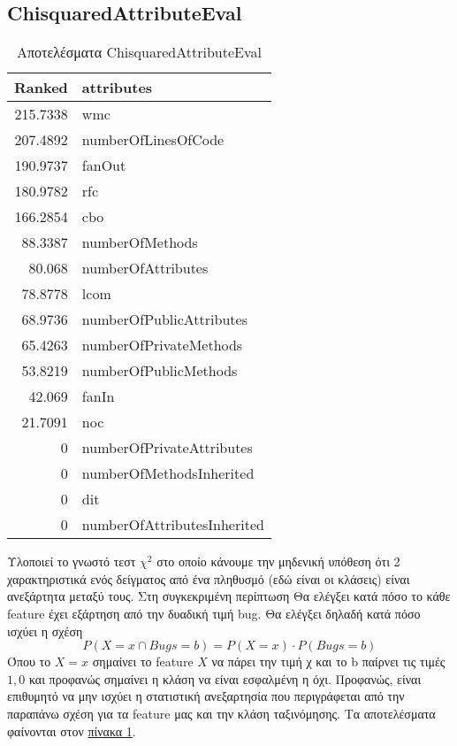 \subsection{ChisquaredAttributeEval}
\begin{table}[tbh]
\centering
\begin{tabular}{r|l}
Ranked& attributes\\
\hline
215.7338 &  wmc\\
207.4892 &   numberOfLinesOfCode\\
190.9737 &   fanOut\\
180.9782 &  rfc\\
166.2854 &   cbo\\
88.3387 &  numberOfMethods\\
80.068  &   numberOfAttributes\\
78.8778&   lcom\\
68.9736&   numberOfPublicAttributes\\
65.4263&   numberOfPrivateMethods\\
53.8219&   numberOfPublicMethods\\
42.069  &   fanIn\\
21.7091&    noc\\
0      &  numberOfPrivateAttributes\\
0     &   numberOfMethodsInherited\\
0    &     dit\\
0    &     numberOfAttributesInherited\\
\end{tabular}
\caption{Αποτελέσματα ChisquaredAttributeEval}
\label{table:ChisquaredAttributeEval}
\end{table}
Υλοποιεί το γνωστό τεστ $\chi^2 $ στο οποίο κάνουμε την μηδενική υπόθεση ότι 2 χαρακτηριστικά ενός δείγματος από ένα πληθυσμό (εδώ είναι οι κλάσεις) είναι ανεξάρτητα μεταξύ τους.
Στη συγκεκριμένη περίπτωση Θα ελέγξει κατά πόσο το κάθε feature έχει εξάρτηση από την δυαδική τιμή bug.
Θα ελέγξει δηλαδή  κατά πόσο ισχύει η σχέση
\[ P(X=x \cap Bugs = b) = P(X=x) \cdot P(Bugs =b) \]
Όπου το $X=x$ σημαίνει το feature $Χ$ να πάρει την τιμή χ και το b  παίρνει τις τιμές $1,0$ και προφανώς σημαίνει η κλάση να είναι εσφαλμένη η όχι.
Προφανώς, είναι επιθυμητό να μην ισχύει η στατιστική ανεξαρτησία που περιγράφεται από την παραπάνω σχέση για τα feature μας και την κλάση ταξινόμησης.
Τα αποτελέσματα φαίνονται στον
\hyperref[table:ChisquaredAttributeEval]{πίνακα \ref{table:ChisquaredAttributeEval}}.
\FloatBarrier

